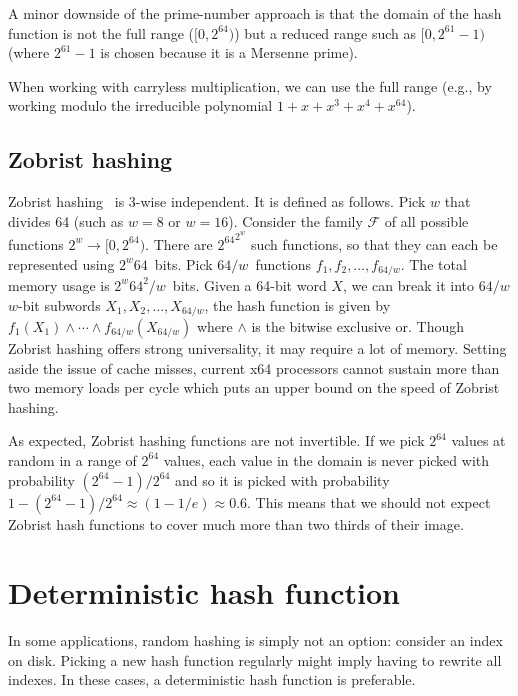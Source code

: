 \documentclass{article}
\newcommand\xor{\wedge}
\begin{document}
 A minor downside of the prime-number approach is that the domain of the hash function is not the full range ($[0,2^{64})$) but a reduced range such as $[0, 2^{61}-1)$ (where $2^{61}-1$ is chosen because it is a Mersenne prime). 
 
 When working with carryless multiplication, we can use the full range (e.g., by working modulo the irreducible polynomial $1+x+x^3+x^4+x^{64}$).



\subsection{Zobrist hashing}


Zobrist hashing~\cite{zobrist1970, zobrist1990new,thorup2012tabulation,Patrascu:2012:PST:2220357.2220361} is 3-wise independent. It is defined as follows. Pick $w$ that divides 64 (such as $w=8$ or $w=16$).
Consider the family $\mathcal{F}$ of all possible functions $2^w \to [0,2^{64})$. There are ${2^{64}}^{2^w}$ such functions, so that they can each be represented using $2^w 64$~bits. Pick $64/w$~functions $f_1, f_2, \ldots, f_{64/w}$. The total memory usage is $2^w 64^2/w$~bits. 
Given a 64-bit word $X$, we can break it into $64/w$ $w$-bit subwords $X_1,X_2, \ldots, X_{64/w}$, 
the hash function is given by $ f_1(X_1) \xor \cdots \xor  f_{64/w}(X_{64/w})$ where $\xor{}$ is the bitwise exclusive or. Though Zobrist hashing offers strong universality, it may require a lot of memory. Setting aside the issue of cache misses, current x64 processors cannot sustain more than two memory loads per cycle which puts an upper bound on the speed of Zobrist hashing.

As expected, Zobrist hashing functions are not invertible.
If we pick $2^{64}$ values at random in a range of $2^{64}$ values, each value in the domain is never picked with probability $(2^{64}-1)/2^{64}$ and so it is picked with probability  $1-(2^{64}-1)/2^{64} \approx (1-1/e) \approx 0.6$. This means that we should not expect Zobrist hash functions to cover much more than two thirds of their image.

\section{Deterministic hash function}


In some applications, random hashing is simply not an option: consider an index on disk. Picking a new hash function regularly might imply having to rewrite all indexes.
In these cases, a deterministic hash function is preferable.
\end{document}
